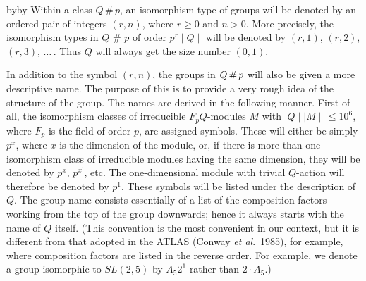 {\advance\leftskip by\manindent \advance\rightskip by\manindent
Within a class $Q\,\#\,p$, an isomorphism type  of groups will be denoted
by an  ordered pair of  integers $(r,n)$, where $r \geq  0$ and $n  > 0$.
More precisely, the isomorphism  types in $Q$ \# $p$  of order $p^r  \!\!
\mid  \!\! Q  \!\!  \mid$ will be  denoted by  $(r,1)$, $(r,2)$, $(r,3)$,
$\ldots\,$. Thus $Q$ will always get the size number $(0,1)$.

In  addition to the symbol $(r,n)$,  the groups in $Q  \,  {\sl \#} \, p$
will  also be given a  more descriptive name.  The purpose of  this is to
provide a very rough idea of  the structure of  the group.  The names are
derived in the following manner. First of all, the isomorphism classes of
irreducible  $F_pQ$-modules $M$ with $\mid \!\!  Q  \!\! \mid \mid \!\! M
\!\! \mid \,  \leq 10^6$,  where $F_p$ is   the field of  order $p$,  are
assigned symbols. These  will either  be simply $p^x$,  where $x$  is the
dimension of the module, or, if there is more  than one isomorphism class
of irreducible modules having the same dimension, they will be denoted by
$p^x$, $p^{x^\prime}$,  etc.   The one-dimensional  module   with trivial
$Q$-action  will therefore be denoted  by  $p^1$. These  symbols will  be
listed under the description of $Q$.  The group name consists essentially
of a list  of the composition factors  working from the  top of the group
downwards; hence  it always  starts with the  name  of $Q$ itself.  (This
convention is the most  convenient in our  context,  but it is  different
from that adopted  in the ATLAS (Conway  {\it et al}.~1985), for example,
where composition factors  are listed in the  reverse order. For example,
we denote a  group isomorphic to $SL(2,5)$  by  $A_5 2^1$ rather  than $2
\cdot A_5$.)

}
